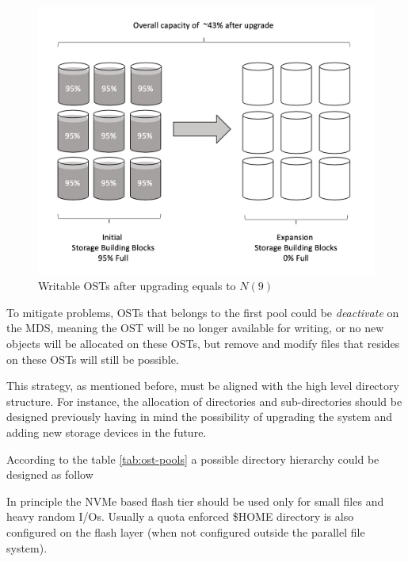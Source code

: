 \documentclass{article}
\begin{document}
\begin{figure}[h]
    \centering
    \includegraphics[scale=0.39]{fillup-append.png}
    \caption{Writable OSTs after upgrading equals to $N(9)$}
    \label{fig:fillup}
\end{figure}

To mitigate problems, OSTs that belongs to the first pool could be \textit{deactivate} on the MDS, meaning the OST will be no longer available for writing, or no new objects will be allocated on these OSTs, but remove and modify files that resides on these OSTs will still be possible. 

This strategy, as mentioned before, must be aligned with the high level directory structure. For instance, the allocation of directories and sub-directories should be designed previously having in mind the possibility of upgrading the system and adding new storage devices in the future. 

According to the table \ref{tab:ost-pools} a possible directory hierarchy could be designed as follow


In principle the NVMe based flash tier should be used only for small files and heavy random I/Os. Usually a quota enforced \$HOME directory is also configured on the flash layer (when not configured outside the parallel file system).
\end{document}
